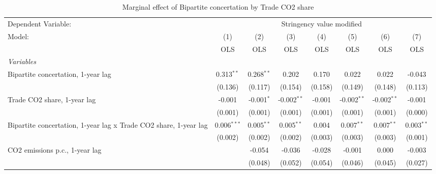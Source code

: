 
\begin{table}[htbp]
   \caption{Marginal effect of Bipartite concertation by Trade CO2 share}
   \centering
   \begin{tabular}{lccccccc}
      \toprule
      Dependent Variable: & \multicolumn{7}{c}{Stringency value modified}\\
      Model:                                                           & (1)           & (2)          & (3)           & (4)          & (5)           & (6)           & (7)\\  
                                                                       &  OLS          & OLS          & OLS           & OLS          & OLS           & OLS           & OLS\\  
      \midrule
      \emph{Variables}\\
      Bipartite concertation, 1-year lag                               & 0.313$^{**}$  & 0.268$^{**}$ & 0.202         & 0.170        & 0.022         & 0.022         & -0.043\\   
                                                                       & (0.136)       & (0.117)      & (0.154)       & (0.158)      & (0.149)       & (0.148)       & (0.113)\\   
      Trade CO2 share, 1-year lag                                      & -0.001        & -0.001$^{*}$ & -0.002$^{**}$ & -0.001       & -0.002$^{**}$ & -0.002$^{**}$ & -0.001\\   
                                                                       & (0.001)       & (0.001)      & (0.001)       & (0.001)      & (0.001)       & (0.001)       & (0.000)\\   
      Bipartite concertation, 1-year lag x Trade CO2 share, 1-year lag & 0.006$^{***}$ & 0.005$^{**}$ & 0.005$^{**}$  & 0.004        & 0.007$^{**}$  & 0.007$^{**}$  & 0.003$^{**}$\\   
                                                                       & (0.002)       & (0.002)      & (0.002)       & (0.003)      & (0.003)       & (0.003)       & (0.001)\\   
      CO2 emissions p.c., 1-year lag                                   &               & -0.054       & -0.036        & -0.028       & -0.001        & 0.000         & -0.003\\   
                                                                       &               & (0.048)      & (0.052)       & (0.054)      & (0.046)       & (0.045)       & (0.027)\\   

\end{tabular}
\end{table}
